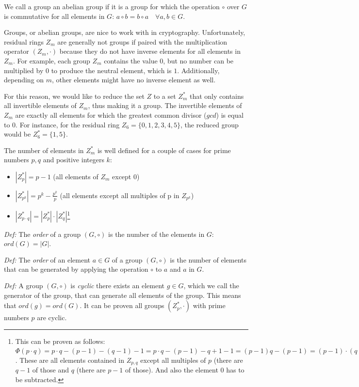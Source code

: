 We call a group an abelian group if it is a group for which the operation $\circ$ over $G$ is commutative for all elements in $G$:
$a \circ b = b \circ a \quad \forall a,b \in G$.

Groups, or abelian groups, are nice to work with in cryptography.
Unfortunately, residual rings $Z_m$ are generally not groups if paired with the multiplication operator $(Z_m,\cdot)$ because they do not have inverse elements for all elements in $Z_m$. For example, each group $Z_m$ contains the value $0$, but no number can be multiplied by $0$ to produce the neutral element, which is $1$.
Additionally, depending on $m$, other elements might have no inverse element as well.

For this reason, we would like to reduce the set $Z$ to a set $Z_m^*$ that only contains all invertible elements of $Z_m$, thus making it a group.
The invertible elements of $Z_m$ are exactly all elements for which the greatest common divisor ($gcd$) is equal to $0$.
For instance, for the residual ring $Z_6 = \{0, 1, 2, 3, 4, 5\}$, the reduced group would be $Z_6^* = \{1, 5 \}$.

The number of elements in $Z_m^*$ is well defined for a couple of cases for prime numbers $p,q$ and positive integers $k$:

\begin{itemize}
    \item $|Z_p^*| = p-1$ (all elements of $Z_m$ except $0$)
    \item $|Z_{p^k}^*| = p^k - \frac{p^k}{p}$ (all elements except all multiples of p in $Z_{p^k}$)
    \item $|Z_{p \cdot q}^*| = |Z_{p}^*| \cdot |Z_{q}^*|$\footnote{This can be proven as follows: $\Phi(p \cdot q) = p \cdot q - (p-1) - (q-1) - 1 = p \cdot q - (p-1) - q  + 1 - 1 = (p-1)q - (p-1) = (p-1) \cdot (q-1) = \Phi(p) \cdot \Phi(q)$. These are all elements contained in $Z_{p,q}$ except all multiples of $p$ (there are $q-1$ of those and $q$ (there are $p-1$ of those). And also the element $0$ has to be subtracted.}
\end{itemize}

\textit{Def:} The \emph{order} of a group $(G, \circ)$ is the number of the elements in $G$: $ord(G) = |G|$.

\textit{Def:} The \emph{order} of an element $a \in G$ of a group $(G, \circ)$ is the number of elements that can be generated by applying the operation $\circ$ to $a$ and $a$ in $G$.

\textit{Def:} A group $(G, \circ)$ is \emph{cyclic} there exists an element $g \in G$, which we call the generator of the group, that can generate all elements of the group. This means that $ord(g) = ord(G)$.
It can be proven all groups $(Z_p^*, \cdot)$ with prime numbers $p$ are cyclic.

